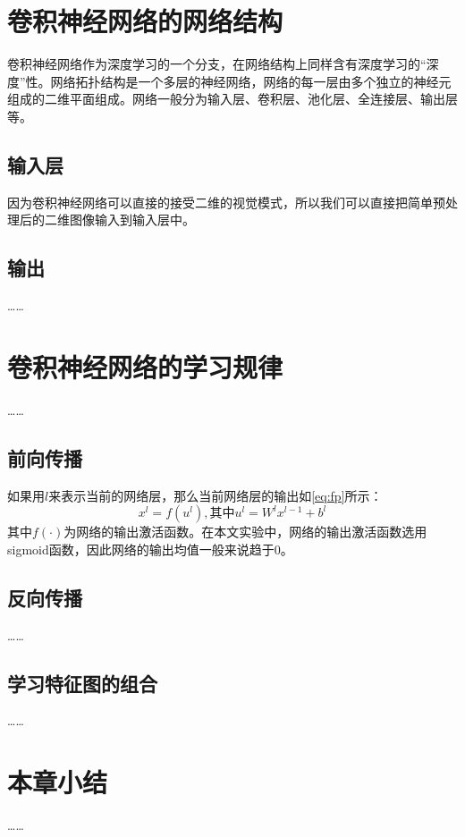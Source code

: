 \section{卷积神经网络的网络结构}
卷积神经网络作为深度学习的一个分支，在网络结构上同样含有深度学习的“深度”性。网络拓扑结构是一个多层的神经网络，网络的每一层由多个独立的神经元组成的二维平面组成。网络一般分为输入层、卷积层、池化层、全连接层、输出层等。
\subsection{输入层}
因为卷积神经网络可以直接的接受二维的视觉模式，所以我们可以直接把简单预处理后的二维图像输入到输入层中。
\subsection{输出}
……
\section{卷积神经网络的学习规律}
……
\subsection{前向传播}
如果用$l$来表示当前的网络层，那么当前网络层的输出如\autoref{eq:fp}所示：
\begin{equation}
    \label{eq:fp}
    {x^l} = f({u^l}),\text{其中}{u^l} = {W^l}{x^{l - 1}} + {b^l}
\end{equation}
其中$f(\cdot)$为网络的输出激活函数。在本文实验中，网络的输出激活函数选用sigmoid函数，因此网络的输出均值一般来说趋于0。
\subsection{反向传播}
……
\subsection{学习特征图的组合}
……
\section{本章小结}
……
